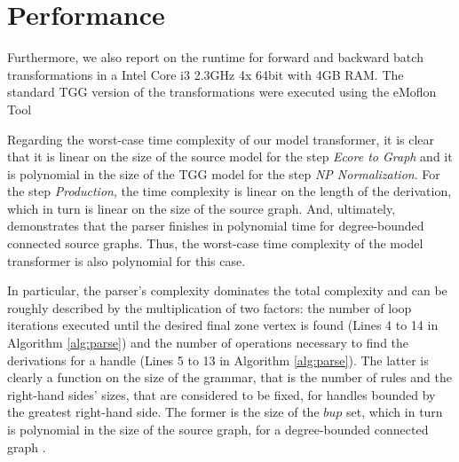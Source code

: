 

\section{Performance}
Furthermore, we also report on the runtime for forward and backward batch transformations in a Intel Core i3 2.3GHz 4x 64bit with 4GB RAM. The standard TGG version of the transformations were executed using the eMoflon Tool %

Regarding the worst-case time complexity of our model transformer, it is clear that it is linear on the size of the source model for the step \textit{Ecore to Graph} and it is polynomial in the size of the TGG model for the step \textit{NP Normalization}. For the step \textit{Production}, the time complexity is linear on the length of the derivation, which in turn is linear on the size of the source graph. And, ultimately, \cite[p. 160]{rozenberg1986boundary} demonstrates that the parser finishes in polynomial time for degree-bounded connected source graphs. Thus, the worst-case time complexity of the model transformer is also polynomial for this case.

In particular, the parser's complexity dominates the total complexity and can be roughly described by the multiplication of two factors: the number of loop iterations executed until the desired final zone vertex is found (Lines 4 to 14 in Algorithm \ref{alg:parse}) and the number of operations necessary to find the derivations for a handle (Lines 5 to 13 in Algorithm \ref{alg:parse}). The latter is clearly a function on the size of the grammar, that is the number of rules and the right-hand sides' sizes, that are considered to be fixed, for handles bounded by the greatest right-hand side. The former is the size of the $bup$ set, which in turn is polynomial in the size of the source graph, for a degree-bounded connected graph \cite[p. 161]{rozenberg1986boundary}.

